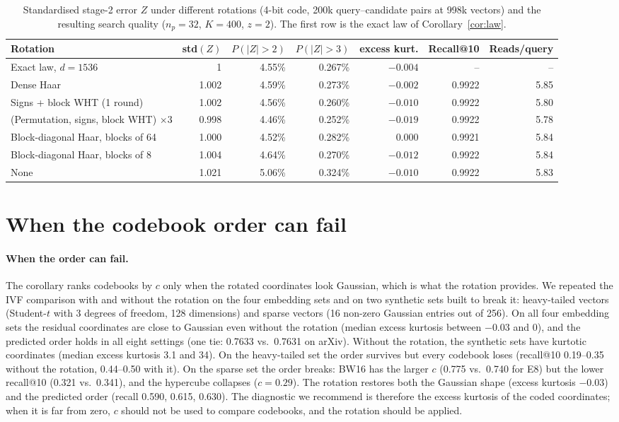 \documentclass[10pt]{article}
\begin{document}
\begin{table}[!htbp]
\caption{Standardised stage-2 error $Z$ under different rotations (4-bit code, 200k query--candidate pairs at 998k vectors) and the resulting search quality ($n_p=32$, $K=400$, $z=2$). The first row is the exact law of Corollary~\ref{cor:law}.}
\label{tab:rot}
\small
\begin{tabular}{lrrrrrr}
\toprule
Rotation & std$(Z)$ & $P(|Z|{>}2)$ & $P(|Z|{>}3)$ & excess kurt. & Recall@10 & Reads/query \\
\midrule
Exact law, $d=1536$ & 1 & 4.55\% & 0.267\% & $-0.004$ & -- & -- \\
Dense Haar & 1.002 & 4.59\% & 0.273\% & $-0.002$ & 0.9922 & 5.85 \\
Signs + block WHT (1 round) & 1.002 & 4.56\% & 0.260\% & $-0.010$ & 0.9922 & 5.80 \\
(Permutation, signs, block WHT) $\times3$ & 0.998 & 4.46\% & 0.252\% & $-0.019$ & 0.9922 & 5.78 \\
Block-diagonal Haar, blocks of 64 & 1.000 & 4.52\% & 0.282\% & 0.000 & 0.9921 & 5.84 \\
Block-diagonal Haar, blocks of 8 & 1.004 & 4.64\% & 0.270\% & $-0.012$ & 0.9922 & 5.84 \\
None & 1.021 & 5.06\% & 0.324\% & $-0.010$ & 0.9922 & 5.83 \\
\bottomrule
\end{tabular}
\end{table}

\section{When the codebook order can fail}\label{sn:order}
\paragraph{When the order can fail.} The corollary ranks codebooks by $c$ only when the rotated coordinates look Gaussian, which is what the rotation provides. We repeated the IVF comparison with and without the rotation on the four embedding sets and on two synthetic sets built to break it: heavy-tailed vectors (Student-$t$ with 3 degrees of freedom, 128 dimensions) and sparse vectors (16 non-zero Gaussian entries out of 256). On all four embedding sets the residual coordinates are close to Gaussian even without the rotation (median excess kurtosis between $-0.03$ and $0$), and the predicted order holds in all eight settings (one tie: 0.7633 vs.\ 0.7631 on arXiv). Without the rotation, the synthetic sets have kurtotic coordinates (median excess kurtosis 3.1 and 34). On the heavy-tailed set the order survives but every codebook loses (recall@10 0.19--0.35 without the rotation, 0.44--0.50 with it). On the sparse set the order breaks: BW16 has the larger $c$ (0.775 vs.\ 0.740 for E8) but the lower recall@10 (0.321 vs.\ 0.341), and the hypercube collapses ($c=0.29$). The rotation restores both the Gaussian shape (excess kurtosis $-0.03$) and the predicted order (recall 0.590, 0.615, 0.630). The diagnostic we recommend is therefore the excess kurtosis of the coded coordinates; when it is far from zero, $c$ should not be used to compare codebooks, and the rotation should be applied.
\end{document}
